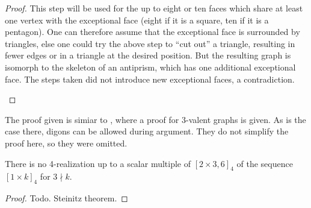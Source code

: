 \begin{lemma}
\begin{proof}
    This step will be used for the up to eight or ten faces which share at least one vertex with the exceptional face (eight if it is a square, ten if it is a pentagon). One can therefore assume that the exceptional face is surrounded by triangles, else one could try the above step to ``cut out'' a triangle, resulting in fewer edges or in a triangle at the desired position. But the resulting graph is isomorph to the skeleton of an antiprism, which has one additional exceptional face. The steps taken did not introduce new exceptional faces, a contradiction.
    \begin{figure}[htpp]
      \centering
    \end{figure}
  \end{proof}
\end{lemma}
\begin{remark}
  The proof given is simiar to \cite{ConvexPolytopes}, where a proof for $3$-valent graphs is given. As is the case there, digons can be allowed during argument. They do not simplify the proof here, so they were omitted.
\end{remark}
\begin{corollary}
  There is no 4-realization up to a scalar multiple of $[2 \times 3, 6]_4$ of the sequence $[1 \times k]_4$ for $3 \nmid k$.
  \begin{proof}
    Todo. Steinitz theorem.
  \end{proof}
\end{corollary}



